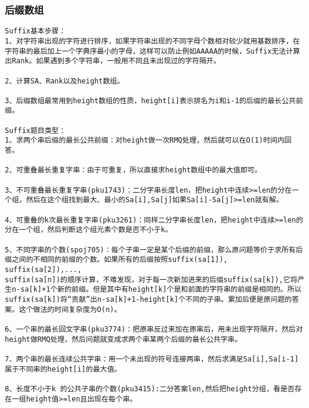 \subsubsection{后缀数组}

\begin{verbatim}
Suffix基本步骤：
1、对字符串出现的字符进行排序，如果字符串出现的不同字母个数相对较少就用基数排序，在字符串的最后加上一个字典序最小的字母，这样可以防止例如AAAAA的时候，Suffix无法计算出Rank。如果遇到多个字符串，一般用不同且未出现过的字符隔开。

2、计算SA、Rank以及height数组。

3、后缀数组最常用到height数组的性质，height[i]表示排名为i和i-1的后缀的最长公共前缀。

Suffix题目类型：
1、求两个串后缀的最长公共前缀：对height做一次RMQ处理，然后就可以在O(1)时间内回答。

2、可重叠最长重复字串：由于可重复，所以直接求height数组中的最大值即可。

3、不可重叠最长重复字串(pku1743)：二分字串长度len，把height中连续>=len的分在一个组，然后在这个组找到最大、最小的Sa[i],Sa[j]如果Sa[i]-Sa[j]>=len就有解。

4、可重叠的k次最长重复字串(pku3261)：同样二分字串长度len，把height中连续>=len的分在一个组，然后判断这个组元素个数是否不小于k。

5、不同字串的个数(spoj705)：每个子串一定是某个后缀的前缀，那么原问题等价于求所有后缀之间的不相同的前缀的个数。如果所有的后缀按照suffix(sa[1]), suffix(sa[2]),...,
suffix(sa[n])的顺序计算，不难发现，对于每一次新加进来的后缀suffix(sa[k]),它将产生n-sa[k]+1个新的前缀。但是其中有height[k]个是和前面的字符串的前缀是相同的。所以suffix(sa[k])将“贡献”出n-sa[k]+1-height[k]个不同的子串。累加后便是原问题的答案。这个做法的时间复杂度为O(n)。

6、一个串的最长回文字串(pku3774)：把原串反过来加在原串后，用未出现字符隔开，然后对height做RMQ处理，然后问题就变成求两个串某两个后缀的最长公共字串。

7、两个串的最长连续公共字串：用一个未出现的符号连接两串，然后求满足Sa[i],Sa[i-1]属于不同串的height[i]的最大值。

8、长度不小于k 的公共子串的个数(pku3415):二分答案len,然后把height分组，看是否存在一组height值>=len且出现在每个串。
\end{verbatim}


